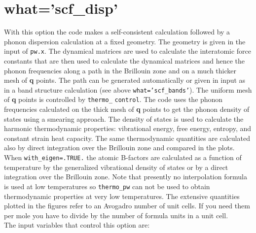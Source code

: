 \documentclass[12pt,a4paper,twoside]{report}
\begin{document}
\newpage
{\color{coral}\section{what='scf\_disp'}}
\color{black}
With this option the code makes a self-consistent calculation followed by
a phonon dispersion calculation at a fixed geometry. The geometry is given in the 
input of \texttt{pw.x}. The dynamical matrices are used to calculate 
the interatomic force constants that are then used 
to calculate the dynamical matrices and hence
the phonon frequencies along a path in the Brillouin zone and on
a much thicker mesh of {\bf q} points. The path can be generated automatically 
or given in input as in a band structure calculation 
(see above \texttt{what='scf\_bands'}). The uniform mesh of {\bf q} points 
is controlled by \texttt{thermo\_} \texttt{control}. The code uses the phonon
frequencies calculated on the thick mesh of {\bf q} points to get 
the phonon density of states using a smearing approach. The density of 
states is used to calculate the harmonic thermodynamic properties: 
vibrational energy, free energy, entropy, and 
constant strain heat capacity.
The same thermodynamic quantities are calculated also by direct 
integration over the Brillouin zone and compared in the plots.
When \texttt{with\_eigen=.TRUE.} the atomic B-factors are
calculated as a function of temperature by the generalized vibrational 
density of states or by a direct integration over 
the Brillouin zone.
Note that presently no interpolation formula is used at low temperatures
so \texttt{thermo\_pw} can not be used to obtain thermodynamic 
properties at very low temperatures. 
The extensive quantities plotted in the figures refer to an 
Avogadro number of unit 
cells. If you need them per mole you have to divide by the number 
of formula units in a unit cell. \\
The input variables that control this option are:
\end{document}
